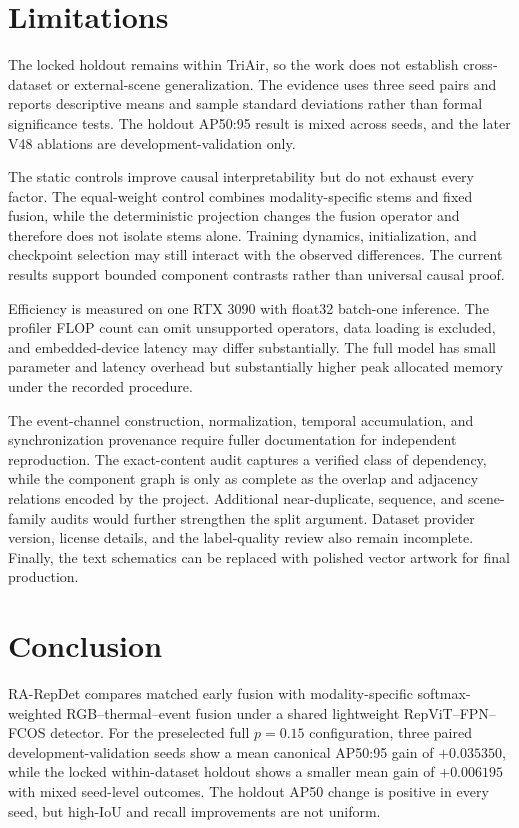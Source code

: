 \section{Limitations}

The locked holdout remains within TriAir, so the work does not establish cross-dataset or external-scene generalization. The evidence uses three seed pairs and reports descriptive means and sample standard deviations rather than formal significance tests. The holdout AP50:95 result is mixed across seeds, and the later V48 ablations are development-validation only.

The static controls improve causal interpretability but do not exhaust every factor. The equal-weight control combines modality-specific stems and fixed fusion, while the deterministic projection changes the fusion operator and therefore does not isolate stems alone. Training dynamics, initialization, and checkpoint selection may still interact with the observed differences. The current results support bounded component contrasts rather than universal causal proof.

Efficiency is measured on one RTX 3090 with float32 batch-one inference. The profiler FLOP count can omit unsupported operators, data loading is excluded, and embedded-device latency may differ substantially. The full model has small parameter and latency overhead but substantially higher peak allocated memory under the recorded procedure.

The event-channel construction, normalization, temporal accumulation, and synchronization provenance require fuller documentation for independent reproduction. The exact-content audit captures a verified class of dependency, while the component graph is only as complete as the overlap and adjacency relations encoded by the project. Additional near-duplicate, sequence, and scene-family audits would further strengthen the split argument. Dataset provider version, license details, and the label-quality review also remain incomplete. Finally, the text schematics can be replaced with polished vector artwork for final production.

\section{Conclusion}

RA-RepDet compares matched early fusion with modality-specific softmax-weighted RGB--thermal--event fusion under a shared lightweight RepViT--FPN--FCOS detector. For the preselected full $p=0.15$ configuration, three paired development-validation seeds show a mean canonical AP50:95 gain of $+0.035350$, while the locked within-dataset holdout shows a smaller mean gain of $+0.006195$ with mixed seed-level outcomes. The holdout AP50 change is positive in every seed, but high-IoU and recall improvements are not uniform.


